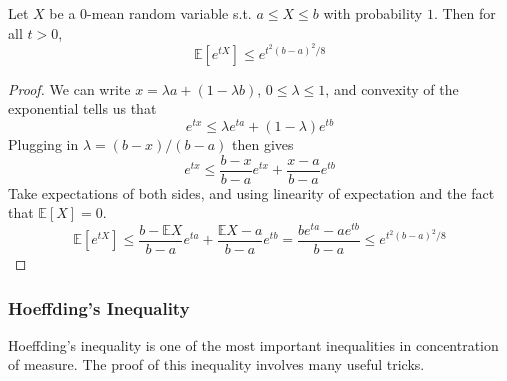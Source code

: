     \begin{lemma}
    Let $X$ be a $0$-mean random variable s.t. $a \leq X \leq b$ with probability $1$. Then for all $t > 0$, 
    \begin{equation}
      \mathbb{E}[ e^{t X}] \leq e^{t^2 (b - a)^2 / 8}
    \end{equation}
    \end{lemma}
    \begin{proof}
      We can write $x = \lambda a + (1 - \lambda b)$, $0 \leq \lambda \leq 1$, and convexity of the exponential tells us that 
      \begin{equation}
        e^{tx} \leq \lambda e^{ta} + (1 - \lambda) e^{tb}
      \end{equation}
      Plugging in $\lambda = (b - x) / (b - a)$ then gives 
      \begin{equation}
        e^{tx} \leq \frac{b - x}{b - a} e^{tx} + \frac{x - a}{b - a} e^{tb}
      \end{equation}
      Take expectations of both sides, and using linearity of expectation and the fact that $\mathbb{E}[X] = 0$. 
      \begin{equation}
        \mathbb{E}[e^{tX}] \leq \frac{b - \mathbb{E} X}{b - a} e^{ta} + \frac{\mathbb{E} X - a}{b - a} e^{tb} = \frac{b e^{ta} - a e^{tb}}{b - a} \leq e^{t^2 (b - a)^2 / 8}
      \end{equation}
    \end{proof}

  \subsubsection{Hoeffding's Inequality}

    Hoeffding's inequality is one of the most important inequalities in concentration of measure. The proof of this inequality involves many useful tricks. 

